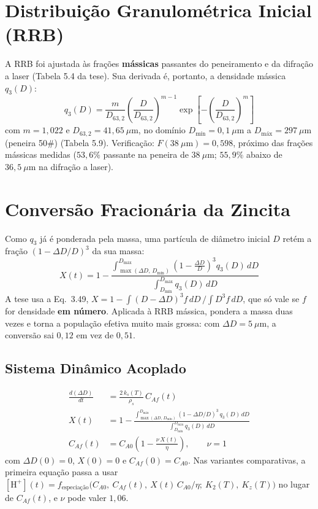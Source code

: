 \documentclass[12pt,a4paper]{article}
\begin{document}
\section{Distribuição Granulométrica Inicial (RRB)}

A RRB foi ajustada às frações \textbf{mássicas} passantes do peneiramento e da difração a laser (Tabela 5.4 da tese). Sua derivada é, portanto, a densidade mássica $q_3(D)$:
\begin{equation}
    q_3(D) = \frac{m}{D_{63{,}2}} \left( \frac{D}{D_{63{,}2}} \right)^{m-1} \exp \left[ -\left( \frac{D}{D_{63{,}2}} \right)^m \right]
\end{equation}
com $m = 1{,}022$ e $D_{63{,}2} = 41{,}65\ \mu\text{m}$, no domínio $D_{\text{mín}} = 0{,}1\ \mu\text{m}$ a $D_{\text{máx}} = 297\ \mu\text{m}$ (peneira 50\#) (Tabela 5.9). Verificação: $F(38\ \mu\text{m}) = 0{,}598$, próximo das frações mássicas medidas ($53{,}6\%$ passante na peneira de $38\ \mu\text{m}$; $55{,}9\%$ abaixo de $36{,}5\ \mu\text{m}$ na difração a laser).

\section{Conversão Fracionária da Zincita}

Como $q_3$ já é ponderada pela massa, uma partícula de diâmetro inicial $D$ retém a fração $(1 - \Delta D/D)^3$ da sua massa:
\begin{equation}
    X(t) = 1 - \frac{\int_{\max(\Delta D,\,D_{\text{mín}})}^{D_{\text{máx}}} \left( 1 - \frac{\Delta D}{D} \right)^3 q_3(D) \, dD}{\int_{D_{\text{mín}}}^{D_{\text{máx}}} q_3(D) \, dD}
\end{equation}
A tese usa a Eq.~3.49, $X = 1 - \int (D - \Delta D)^3 f\,dD \,/ \int D^3 f\,dD$, que só vale se $f$ for densidade \textbf{em número}. Aplicada à RRB mássica, pondera a massa duas vezes e torna a população efetiva muito mais grossa: com $\Delta D = 5\ \mu\text{m}$, a conversão sai $0{,}12$ em vez de $0{,}51$.

\subsection{Sistema Dinâmico Acoplado}
\begin{align}
    \frac{d(\Delta D)}{dt} &= \frac{2 \, k_s(T)}{\rho_s} \, C_{Af}(t) \\
    X(t) &= 1 - \frac{\int_{\max(\Delta D,\,D_{\text{mín}})}^{D_{\text{máx}}} (1 - \Delta D/D)^3 \, q_3(D) \, dD}{\int_{D_{\text{mín}}}^{D_{\text{máx}}} q_3(D) \, dD} \\
    C_{Af}(t) &= C_{A0} \left( 1 - \frac{\nu\,X(t)}{\eta} \right), \qquad \nu = 1
\end{align}
com $\Delta D(0) = 0$, $X(0) = 0$ e $C_{Af}(0) = C_{A0}$. Nas variantes comparativas, a primeira equação passa a usar $[\text{H}^+](t) = f_{\text{especiação}}\big(C_{A0},\ C_{Af}(t),\ X(t)\,C_{A0}/\eta;\ K_2(T),\ K_z(T)\big)$ no lugar de $C_{Af}(t)$, e $\nu$ pode valer $1{,}06$.
\end{document}
